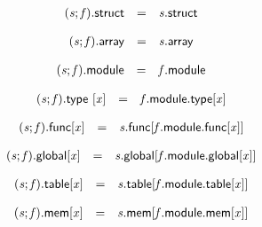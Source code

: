 $$
\begin{array}{@{}lcl@{}l@{}}
({\mathit{s}} ; {\mathit{f}}).\mathsf{struct} &=& {\mathit{s}}.\mathsf{struct} &  \\
\end{array}
$$

$$
\begin{array}{@{}lcl@{}l@{}}
({\mathit{s}} ; {\mathit{f}}).\mathsf{array} &=& {\mathit{s}}.\mathsf{array} &  \\
\end{array}
$$

$$
\begin{array}{@{}lcl@{}l@{}}
({\mathit{s}} ; {\mathit{f}}).\mathsf{module} &=& {\mathit{f}}.\mathsf{module} &  \\
\end{array}
$$

$$
\begin{array}{@{}lcl@{}l@{}}
({\mathit{s}} ; {\mathit{f}}).\mathsf{type}~[{\mathit{x}}] &=& {\mathit{f}}.\mathsf{module}.\mathsf{type}[{\mathit{x}}] &  \\
\end{array}
$$

$$
\begin{array}{@{}lcl@{}l@{}}
{({\mathit{s}} ; {\mathit{f}}).\mathsf{func}}{[{\mathit{x}}]} &=& {\mathit{s}}.\mathsf{func}[{\mathit{f}}.\mathsf{module}.\mathsf{func}[{\mathit{x}}]] &  \\
\end{array}
$$

$$
\begin{array}{@{}lcl@{}l@{}}
{({\mathit{s}} ; {\mathit{f}}).\mathsf{global}}{[{\mathit{x}}]} &=& {\mathit{s}}.\mathsf{global}[{\mathit{f}}.\mathsf{module}.\mathsf{global}[{\mathit{x}}]] &  \\
\end{array}
$$

$$
\begin{array}{@{}lcl@{}l@{}}
{({\mathit{s}} ; {\mathit{f}}).\mathsf{table}}{[{\mathit{x}}]} &=& {\mathit{s}}.\mathsf{table}[{\mathit{f}}.\mathsf{module}.\mathsf{table}[{\mathit{x}}]] &  \\
\end{array}
$$

$$
\begin{array}{@{}lcl@{}l@{}}
{({\mathit{s}} ; {\mathit{f}}).\mathsf{mem}}{[{\mathit{x}}]} &=& {\mathit{s}}.\mathsf{mem}[{\mathit{f}}.\mathsf{module}.\mathsf{mem}[{\mathit{x}}]] &  \\
\end{array}
$$


